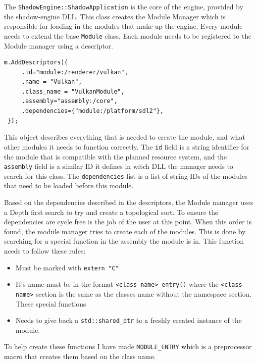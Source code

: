 \begin{listing}[!ht]
    \inputminted{cpp}{content/003-architecture/main.cpp}
    \caption{The main function of the runtime executable}
    \label{listing:shadow-runtime-main}
\end{listing}

The \verb|ShadowEngine::ShadowApplication| is the core of the engine, provided by the shadow-engine DLL. This class creates the Module Manager which is responsible for loading in the modules that make up the engine. Every module needs to extend the base \verb|Module| class. Each module needs to be registered to the Module manager using a descriptor.

\begin{verbatim}
m.AddDescriptors({
	 .id="module:/renderer/vulkan",
	 .name = "Vulkan",
	 .class_name = "VulkanModule",
	 .assembly="assembly:/core",
	 .dependencies={"module:/platform/sdl2"},
 });
\end{verbatim}

This object describes everything that is needed to create the module, and what other modules it needs to function correctly. The \verb|id| field is a string identifier for the module that is compatible with the planned resource system, and the \verb|assembly| field is a similar ID it defines in witch DLL the manager needs to search for this class. The \verb|dependencies| list is a list of string IDs of the modules that need to be loaded before this module.

Based on the dependencies described in the descriptors, the Module manager uses a Depth first search to try and create a topological sort. To ensure the dependencies are cycle free is the job of the user at this point. When this order is found, the module manager tries to create each of the modules. This is done by searching for a special function in the assembly the module is in. This function needs to follow these rules:
\begin{itemize}
    \item Must be marked with \verb|extern "C"|
    \item It's name must be in the format \verb|<class name>_entry()| where the \verb|<class name>| section is the same as the classes name without the namespace section. These special functions
    \item Needs to give back a \verb|std::shared_ptr| to a freshly created instance of the module.
\end{itemize}

To help create these functions I have made \verb|MODULE_ENTRY| which is a preprocessor macro that creates them based on the class name.

